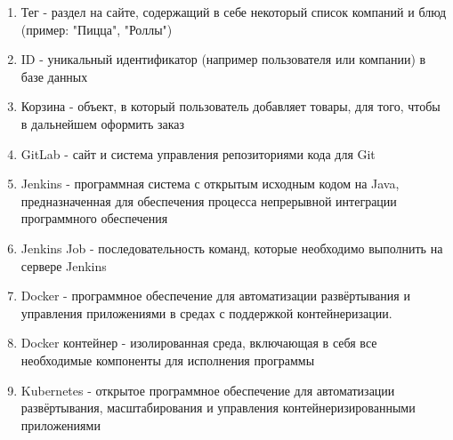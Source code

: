 \begin{enumerate}
  \item Тег - раздел на сайте, содержащий в себе некоторый список компаний и блюд
  (пример: "Пицца", "Роллы")
  \item ID - уникальный идентификатор (например пользователя или компании) в базе данных
  \item Корзина - объект, в который пользователь добавляет товары, для того, чтобы в
  дальнейшем оформить заказ
  \item GitLab - сайт и система управления репозиториями кода для Git
  \item Jenkins - программная система с открытым исходным кодом на Java,
  предназначенная для обеспечения процесса непрерывной интеграции программного обеспечения
  \item Jenkins Job - последовательность команд, которые необходимо выполнить на сервере Jenkins
  \item Docker - программное обеспечение для автоматизации развёртывания и управления
  приложениями в средах с поддержкой контейнеризации.
  \item Docker контейнер - изолированная среда, включающая в себя все необходимые
  компоненты для исполнения программы
  \item Kubernetes - открытое программное обеспечение для автоматизации развёртывания,
  масштабирования и управления контейнеризированными приложениями
\end{enumerate}
